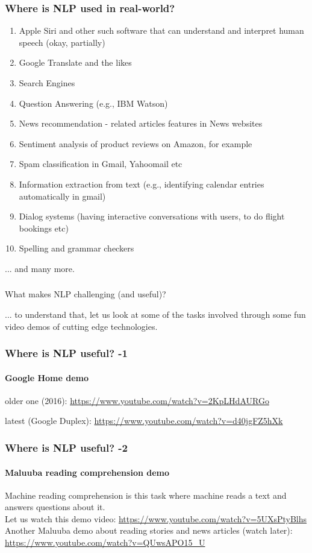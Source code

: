 \documentclass{beamer}
\begin{document}
\begin{frame}
\frametitle{Where is NLP used in real-world?}
\begin{enumerate}
\item Apple Siri and other such software that can understand and interpret human speech (okay, partially)
\item Google Translate and the likes
\item Search Engines
\item Question Answering (e.g., IBM Watson)
\item News recommendation - related articles features in News websites
\item Sentiment analysis of product reviews on Amazon, for example
\item Spam classification in Gmail, Yahoomail etc
\item Information extraction from text (e.g., identifying calendar entries automatically in gmail)
\item Dialog systems (having interactive conversations with users, to do flight bookings etc)
\item Spelling and grammar checkers
\end{enumerate}
... and many more. 
\end{frame}

\begin{frame}
\frametitle{}
\begin{center}
What makes NLP challenging (and useful)?
\end{center}
... to understand that, let us look at some of the tasks involved through some fun video demos of cutting edge technologies.
\end{frame}

\begin{frame}
\frametitle{Where is NLP useful? -1}
\framesubtitle{Google Home demo}
older one (2016): \footnotesize \url{https://www.youtube.com/watch?v=2KpLHdAURGo} \\ \bigskip \pause

\normalsize latest (Google Duplex): \footnotesize \url{https://www.youtube.com/watch?v=d40jgFZ5hXk}
\end{frame}

\begin{frame}
\frametitle{Where is NLP useful? -2}
\framesubtitle{Maluuba reading comprehension demo}
Machine reading comprehension is this task where machine reads a text and answers questions about it.
\\ Let us watch this demo video: \url{https://www.youtube.com/watch?v=5UXsPtyBlhs}
\\ \bigskip Another Maluuba demo about reading stories and news articles (watch later): \url{https://www.youtube.com/watch?v=QUwsAPO15_U}
\end{frame}
\end{document}
